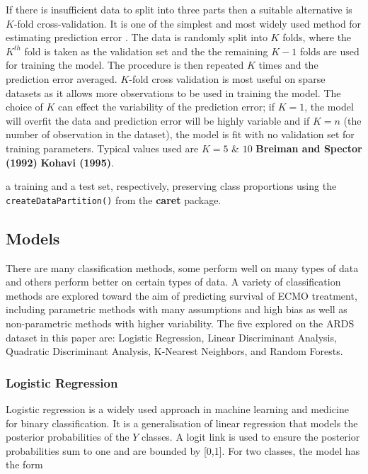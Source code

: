 \documentclass[12pt,]{article}
\begin{document}
If there is insufficient data to split into three parts then a suitable
alternative is \(K\)-fold cross-validation. It is one of the simplest
and most widely used method for estimating prediction error
\autocite{hastie_elements_2009}. The data is randomly split into \(K\)
folds, where the \(K^{th}\) fold is taken as the validation set and the
the remaining \(K-1\) folds are used for training the model. The
procedure is then repeated \(K\) times and the prediction error
averaged. \(K\)-fold cross validation is most useful on sparse datasets
as it allows more observations to be used in training the model. The
choice of \(K\) can effect the variability of the prediction error; if
\(K=1\), the model will overfit the data and prediction error will be
highly variable and if \(K=n\) (the number of observation in the
dataset), the model is fit with no validation set for training
parameters. Typical values used are \(K=5\) \& \(10\)
\autocite{hastie_elements_2009} \textbf{Breiman and Spector (1992)}
\textbf{Kohavi (1995)}.

a training and a test set, respectively, preserving class proportions
using the \texttt{createDataPartition()} from the \textbf{caret}
package.

\subsection{Models}\label{models}

There are many classification methods, some perform well on many types
of data and others perform better on certain types of data. A variety of
classification methods are explored toward the aim of predicting
survival of ECMO treatment, including parametric methods with many
assumptions and high bias as well as non-parametric methods with higher
variability. The five explored on the ARDS dataset in this paper are:
Logistic Regression, Linear Discriminant Analysis, Quadratic
Discriminant Analysis, K-Nearest Neighbors, and Random Forests.

\subsubsection{Logistic Regression}\label{logistic-regression}

Logistic regression is a widely used approach in machine learning and
medicine for binary classification. It is a generalisation of linear
regression that models the posterior probabilities of the \(Y\) classes.
A logit link is used to ensure the posterior probabilities sum to one
and are bounded by {[}0,1{]}. For two classes, the model has the form
\end{document}
